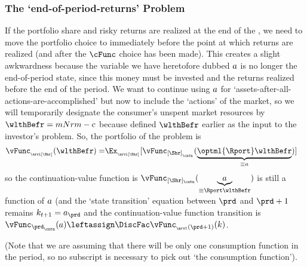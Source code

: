 \documentclass[SolvingMicroDSOPs]{subfiles}
\begin{document}
\subsubsection{The `end-of-period-returns' Problem}
If the portfolio share and risky returns are realized at the end of the {\interval}, we need to move the portfolio choice {\stg} to immediately before the point at which returns are realized (and after the $\cFunc$ choice has been made).  This creates a slight awkwardness because the variable we have heretofore dubbed $a$ is no longer the end-of-period state, since this money must be invested and the returns realized before the end of the period.  We want to continue using $a$ for `assets-after-all-actions-are-accomplished' but now to include the `actions' of the market, so we will temporarily designate the consumer's unspent market resources by $\wlthBefr = mNrm-\cNrm$ because defined $\wlthBefr$ earlier as the input to the investor's problem.  So, the portfolio {\stg} of the problem is
\begin{equation}\begin{gathered}\begin{aligned}
  \vFunc_{_\arvl[\Shr]}(\wlthBefr) = & \Ex_{_\arvl[\Shr]}[\vFunc_{[\Shr]_{_\cntn}}(\underbrace{\optml{\Rport}\wlthBefr}_{\equiv \aNrm})] %
    \end{aligned}\end{gathered}\end{equation}
so the continuation-value function is $\vFunc_{[\Shr]_\cntn}(\underbrace{\aNrm}_{\equiv \Rport \wlthBefr})$ is still a function of $a$ (and
the `state transition' equation between $\prd$ and $\prd+1$ remains $\kNrm_{t+1} = \aNrm_{\prd}$ and the continuation-value function transition is $\vFunc_{\prd_\cntn}(\aNrm) \leftassign \DiscFac \vFunc_{_\arvl(\prd+1)}(\kNrm)$.



(Note that we are assuming that there will be only one consumption function in the period, so no {\stg} subscript is necessary to pick out `the consumption function'). 
\end{document}
